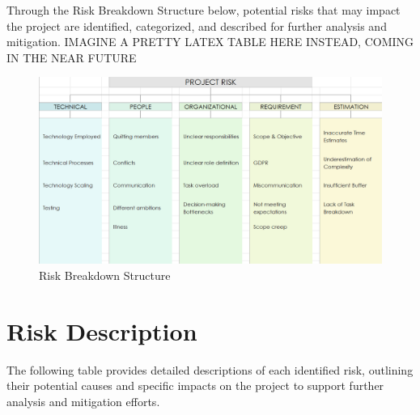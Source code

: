 \documentclass{article}
\begin{document}
Through the Risk Breakdown Structure below, potential risks that may impact the project are identified, categorized, and described for further analysis and mitigation.
IMAGINE A PRETTY LATEX TABLE HERE INSTEAD, COMING IN THE NEAR FUTURE

\begin{figure}[h]
    \centering
    \includegraphics[width=1.0\linewidth]{Risk Diagram List.png}
    \caption{Risk Breakdown Structure}
    \label{fig:enter-label}
\end{figure}
\pagebreak

\section{Risk Description}
The following table provides detailed descriptions of each identified risk, outlining their potential causes and specific impacts on the project to support further analysis and mitigation efforts.
\end{document}
